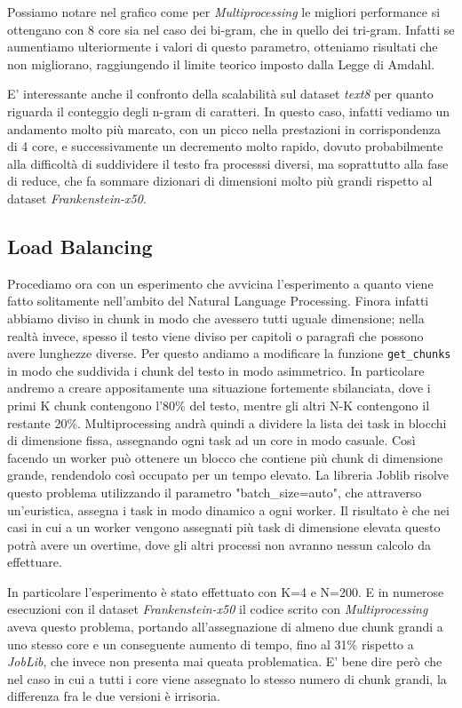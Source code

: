 \documentclass[10pt,twocolumn,letterpaper]{article}
\begin{document}
Possiamo notare nel grafico come per \textit{Multiprocessing} le migliori performance si ottengano con 8 core sia nel caso dei bi-gram, che in quello dei tri-gram. Infatti se aumentiamo ulteriormente i valori di questo parametro, otteniamo risultati che non migliorano, raggiungendo il limite teorico imposto dalla Legge di Amdahl.\par
E' interessante anche il confronto della scalabilità sul dataset \textit{text8} per quanto riguarda il conteggio degli n-gram di caratteri. In questo caso, infatti vediamo un andamento molto più marcato, con un picco nella prestazioni in corrispondenza di 4 core, e successivamente un decremento molto rapido, dovuto probabilmente alla difficoltà di suddividere il testo fra processsi diversi, ma soprattutto alla fase di reduce, che fa sommare dizionari di dimensioni molto più grandi rispetto al dataset \textit{Frankenstein-x50}.





\subsection{Load Balancing}
Procediamo ora con un esperimento che avvicina l'esperimento a quanto viene fatto solitamente nell'ambito del Natural Language Processing. Finora infatti abbiamo diviso in chunk in modo che avessero tutti uguale dimensione; nella realtà invece, spesso il testo viene diviso per capitoli o paragrafi che possono avere lunghezze diverse. Per questo andiamo a modificare la funzione \lstinline{get_chunks} in modo che suddivida i chunk del testo in modo asimmetrico. In particolare andremo a creare appositamente una situazione fortemente sbilanciata, dove i primi K chunk contengono l'80\% del testo, mentre gli altri N-K contengono il restante 20\%.
Multiprocessing andrà quindi a dividere la lista dei task in blocchi di dimensione fissa, assegnando ogni task ad un core in modo casuale. Così facendo un worker può ottenere un blocco che contiene più chunk di dimensione grande, rendendolo così occupato per un tempo elevato.
La libreria Joblib risolve questo problema utilizzando il parametro "batch\_size=auto", che attraverso un'euristica, assegna i task in modo dinamico a ogni worker.
Il risultato è che nei casi in cui a un worker vengono assegnati più task di dimensione elevata questo potrà avere un overtime, dove gli altri processi non avranno nessun calcolo da effettuare.

In particolare l'esperimento è stato effettuato con K=4 e N=200. E in numerose esecuzioni con il dataset \textit{Frankenstein-x50} il codice scrito con \textit{Multiprocessing} aveva questo problema, portando all'assegnazione di almeno due chunk grandi a uno stesso core e un conseguente aumento di tempo, fino al 31\% rispetto a \textit{JobLib}, che invece non presenta mai queata problematica. E' bene dire però che nel caso in cui a tutti i core viene assegnato lo stesso numero di chunk grandi, la differenza fra le due versioni è irrisoria.
\end{document}
